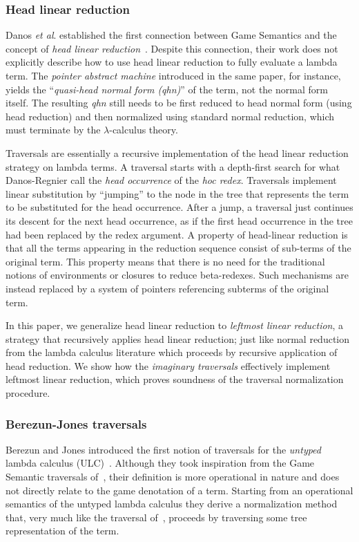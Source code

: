 \documentclass{elsarticle}
\theoremstyle{plain}
\theoremstyle{definition}
\theoremstyle{remark}
\newcommand{\etal}{\textit{et al}. }
\begin{document}
\subsubsection{Head linear reduction}
Danos \etal established the first connection between Game Semantics and the concept of \emph{head linear reduction}~\cite{danos-head,danosherbelinregnier1996}. Despite this connection, their work does not explicitly describe how to use head linear reduction to fully evaluate a lambda term. The \emph{pointer abstract machine} introduced in the same paper, for instance, yields the ``\emph{quasi-head normal form (qhn)}'' of the term, not the normal form itself. The resulting \emph{qhn} still needs to be first reduced to head normal form (using head reduction) and then normalized using standard normal reduction, which must terminate by the $\lambda$-calculus theory.

Traversals are essentially a recursive implementation of the head linear reduction strategy on lambda terms. A traversal starts with a depth-first search for what Danos-Regnier call the \emph{head occurrence} of the \emph{hoc redex}. Traversals implement linear substitution by ``jumping'' to the node in the tree that represents the term to be substituted for the head occurrence. After a jump, a traversal just continues its descent for the next head occurrence, as if the first head occurrence in the tree had been replaced by the redex argument. A property of head-linear reduction is that all the terms appearing in the reduction sequence consist of sub-terms of the original term. This property means that there is no need for the traditional notions of environments or closures to reduce beta-redexes. Such mechanisms are instead replaced by a system of pointers referencing subterms of the original term.

In this paper, we generalize head linear reduction to \emph{leftmost linear reduction}, a strategy that recursively applies head linear reduction; just like normal reduction from the lambda calculus literature which proceeds by recursive application of head reduction.
We show how the \emph{imaginary traversals} effectively implement leftmost linear reduction, which proves soundness of the traversal normalization procedure.


\subsubsection{Berezun-Jones traversals}
Berezun and Jones introduced the first notion of traversals for the \emph{untyped} lambda calculus (ULC)~\cite{JonesBerezunLLL}. Although they took inspiration from the Game Semantic traversals of~\cite{Ong2006,BlumGalop2008}, their definition is more operational in nature and does not directly relate to the game denotation of a term. Starting from an operational semantics of the untyped lambda calculus they derive a normalization method that, very much like the traversal of~\cite{Ong2006, BlumPhd}, proceeds by traversing some tree representation of the term.
\end{document}
